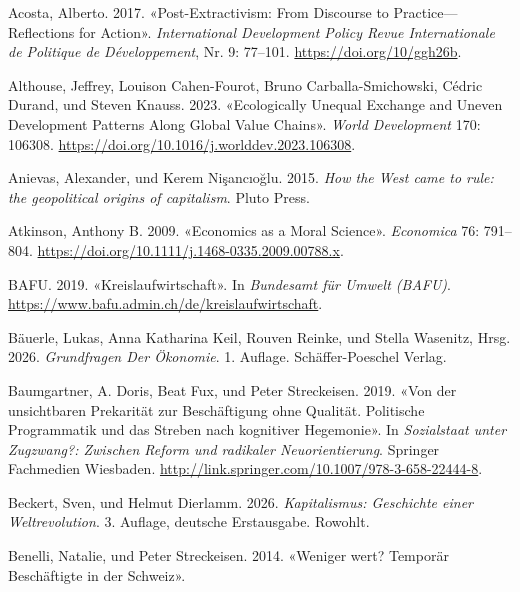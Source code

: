 \documentclass[
  nswissgerman,
  a4paper,
  DIV=11,
  numbers=noendperiod,
  oneside,
  openany]{scrreprt}
\newlength{\cslhangindent}
\newenvironment{CSLReferences}[2] %
 {\begin{list}{}{%
  \setlength{\itemindent}{0pt}
  \setlength{\leftmargin}{0pt}
  \setlength{\parsep}{0pt}
  \ifodd #1
   \setlength{\leftmargin}{\cslhangindent}
   \setlength{\itemindent}{-1\cslhangindent}
  \fi
  \setlength{\itemsep}{#2\baselineskip}}}
 {\end{list}}
\begin{document}
\protect{}\label{refs}
\begin{CSLReferences}{1}{1}
Acosta, Alberto. 2017. {«Post-Extractivism: From Discourse to
Practice---Reflections for Action»}. \emph{International Development
Policy \textbar{} Revue Internationale de Politique de Développement},
Nr. 9: 77--101. \url{https://doi.org/10/ggh26b}.

Althouse, Jeffrey, Louison Cahen-Fourot, Bruno Carballa-Smichowski,
Cédric Durand, und Steven Knauss. 2023. {«Ecologically Unequal Exchange
and Uneven Development Patterns Along Global Value Chains»}. \emph{World
Development} 170: 106308.
\url{https://doi.org/10.1016/j.worlddev.2023.106308}.

Anievas, Alexander, und Kerem Nişancıoğlu. 2015. \emph{How the West came
to rule: the geopolitical origins of capitalism}. Pluto Press.

Atkinson, Anthony B. 2009. {«Economics as a Moral Science»}.
\emph{Economica} 76: 791--804.
\url{https://doi.org/10.1111/j.1468-0335.2009.00788.x}.

BAFU. 2019. {«Kreislaufwirtschaft»}. In \emph{Bundesamt für Umwelt
(BAFU)}. \url{https://www.bafu.admin.ch/de/kreislaufwirtschaft}.

Bäuerle, Lukas, Anna Katharina Keil, Rouven Reinke, und Stella Wasenitz,
Hrsg. 2026. \emph{Grundfragen Der {Ökonomie}}. 1. Auflage.
Schäffer-Poeschel Verlag.

Baumgartner, A. Doris, Beat Fux, und Peter Streckeisen. 2019. {«Von der
unsichtbaren Prekarität zur Beschäftigung ohne Qualität. Politische
Programmatik und das Streben nach kognitiver Hegemonie»}. In
\emph{Sozialstaat unter Zugzwang?: Zwischen Reform und radikaler
Neuorientierung}. Springer Fachmedien Wiesbaden.
\url{http://link.springer.com/10.1007/978-3-658-22444-8}.

Beckert, Sven, und Helmut Dierlamm. 2026. \emph{Kapitalismus: Geschichte
einer Weltrevolution}. 3. Auflage, deutsche Erstausgabe. Rowohlt.

Benelli, Natalie, und Peter Streckeisen. 2014. {«Weniger wert? Temporär
Beschäftigte in der Schweiz»}.


\end{CSLReferences}
\end{document}
